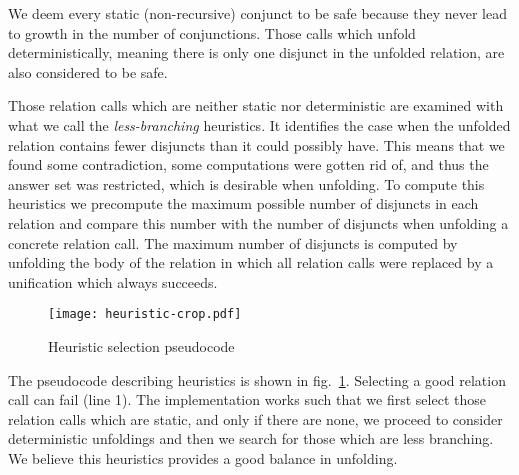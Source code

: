 We deem every static (non-recursive) conjunct to be safe because they never lead to growth in the number of conjunctions.
Those calls which unfold deterministically, meaning there is only one disjunct in the unfolded relation, are also considered to be safe.

Those relation calls which are neither static nor deterministic are examined with what we call the \emph{less-branching} heuristics.
It identifies the case when the unfolded relation contains fewer disjuncts than it could possibly have.
This means that we found some contradiction, some computations were gotten rid of, and thus the answer set was restricted, which is desirable when unfolding.
To compute this heuristics we precompute the maximum possible number of disjuncts in each relation and compare this number with the number of disjuncts when unfolding a concrete relation call.
The maximum number of disjuncts is computed by unfolding the body of the relation in which all relation calls were replaced by a unification which always succeeds.

\begin{figure}[h!]
  \centering
  \texttt{[image: heuristic-crop.pdf]}
  \caption{Heuristic selection pseudocode}
  \label{fig:heu-pseudo}
\end{figure}


The pseudocode describing heuristics is shown in fig.~\ref{fig:heu-pseudo}.
Selecting a good relation call can fail (line 1).
The implementation works such that we first select those relation calls which are static, and only if there are none, we proceed to consider deterministic unfoldings and then we search for those which are less branching.
We believe this heuristics provides a good balance in unfolding.



